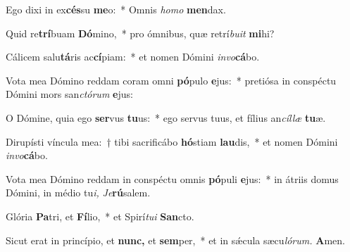 \item Ego dixi in ex\textbf{cés}su \textbf{me}o:~* Omnis \textit{homo} \textbf{men}dax.
\item Quid re\textbf{trí}buam \textbf{Dó}mino,~* pro ómnibus, quæ retrí\textit{buit} \textbf{mi}hi?
\item Cálicem salu\textbf{tá}ris ac\textbf{cí}piam:~* et nomen Dómini \textit{invo}\textbf{cá}bo.
\item Vota mea Dómino reddam coram omni \textbf{pó}pulo \textbf{e}jus:~* pretiósa in conspéctu Dómini mors san\hspace*{0.03em}\textit{ctórum} \textbf{e}jus:
\item O Dómine, quia ego \textbf{ser}vus \textbf{tu}us:~* ego servus tuus, et fílius an\hspace*{0.03em}\textit{cíllæ} \textbf{tu}æ.
\item Dirupísti víncula mea:~† tibi sacrificábo \textbf{hó}stiam \textbf{lau}dis,~* et nomen Dómini \textit{invo}\textbf{cá}bo.
\item Vota mea Dómino reddam in conspéctu omnis \textbf{pó}puli \textbf{e}jus:~* in átriis domus Dómini, in médio tu\hspace{0.03em}\textit{i,} \hspace{0.03em}\textit{Je}\textbf{rú}salem.
\item Glória \textbf{Pa}tri, et \textbf{Fí}lio,~* et Spirí\hspace{0.03em}\textit{tui} \textbf{San}cto.
\item Sicut erat in princípio, et \textbf{nunc,} et \textbf{sem}per,~* et in sǽcula sæcu\hspace{0.03em}\textit{lórum.} \textbf{A}men.